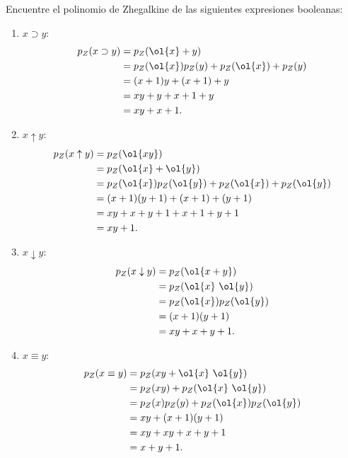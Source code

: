 \begin{ejercicio}
    Encuentre el polinomio de Zhegalkine de las siguientes expresiones booleanas:
    \begin{enumerate}
        \item $x\supset y$:
        \begin{align*}
            p_Z(x\supset y) &= p_Z(\ol{x} + y)\\
            &= p_Z(\ol{x})p_Z(y) + p_Z(\ol{x}) + p_Z(y)\\
            &= (x+1)y + (x+1) + y\\
            &= xy + y + x + 1 + y\\
            &= xy + x + 1.
        \end{align*}

        \item $x\uparrow y$:
        \begin{align*}
            p_Z(x\uparrow y) &= p_Z(\ol{xy})\\
            &= p_Z(\ol{x} + \ol{y})\\
            &= p_Z(\ol{x})p_Z(\ol{y}) + p_Z(\ol{x}) + p_Z(\ol{y})\\
            &= (x+1)(y+1) + (x+1) + (y+1)\\
            &= xy + x + y + 1 + x + 1 + y + 1\\
            &= xy + 1.
        \end{align*}

        \item $x\downarrow y$:
        \begin{align*}
            p_Z(x\downarrow y) &= p_Z(\ol{x+y})\\
            &= p_Z(\ol{x}~\ol{y})\\
            &= p_Z(\ol{x})p_Z(\ol{y})\\
            &= (x+1)(y+1)\\
            &= xy + x + y + 1.
        \end{align*}

        \item $x\equiv y$:
        \begin{align*}
            p_Z(x\equiv y) &= p_Z(xy + \ol{x}~\ol{y})\\
            &= p_Z(xy) + p_Z(\ol{x}~\ol{y})\\
            &= p_Z(x)p_Z(y) + p_Z(\ol{x})p_Z(\ol{y})\\
            &= xy + (x+1)(y+1)\\
            &= xy + xy + x + y + 1\\
            &= x + y + 1.
        \end{align*}


\end{enumerate}
\end{ejercicio}
